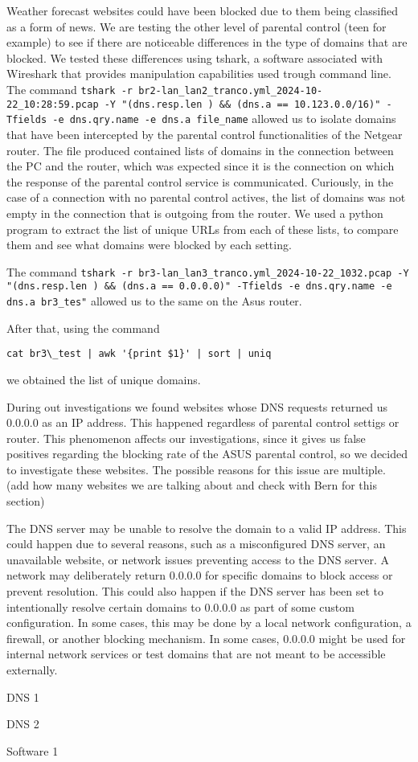 Weather forecast websites could have been blocked due to them being classified as a form of news.
We are testing the other level of parental control (teen for example) to see if there are noticeable differences in the type of domains that are blocked.
We tested these differences using tshark, a software associated with Wireshark that provides manipulation capabilities used trough command line.
The command \texttt{tshark -r br2-lan\_lan2\_tranco.yml\_2024-10-22\_10:28:59.pcap -Y "(dns.resp.len ) \&\& (dns.a == 10.123.0.0/16)" -Tfields -e dns.qry.name -e dns.a \> file\_name} allowed us to isolate domains that have been intercepted by the parental control functionalities of the Netgear router.
The file produced contained lists of domains in the connection between the PC and the router, which was expected since it is the connection on which the response of the parental control service is communicated.
Curiously, in the case of a connection with no parental control actives, the list of domains was not empty in the connection that is outgoing from the router.
We used a python program to extract the list of unique URLs from each of these lists, to compare them and see what domains were blocked by each setting.

The command \texttt{tshark -r br3-lan\_lan3\_tranco.yml\_2024-10-22\_10\:32.pcap -Y "(dns.resp.len ) \&\& (dns.a == 0.0.0.0)" -Tfields -e dns.qry.name -e dns.a \> br3\_tes"} allowed us to the same on the Asus router.
 
After that, using the command \begin{verbatim}cat br3\_test | awk '{print $1}' | sort | uniq\end{verbatim} we obtained the list of unique domains.

During out investigations we found websites whose DNS requests returned us 0.0.0.0 as an IP address.
This happened regardless of parental control settigs or router.
This phenomenon affects our investigations, since it gives us false positives regarding the blocking rate of the ASUS parental control, so we decided to investigate these websites.
The possible reasons for this issue are multiple. (add how many websites we are talking about and check with Bern for this section)

The DNS server may be unable to resolve the domain to a valid IP address. 
This could happen due to several reasons, such as a misconfigured DNS server, an unavailable website, or network issues preventing access to the DNS server.
A network may deliberately return 0.0.0.0 for specific domains to block access or prevent resolution. 
This could also happen if the DNS server has been set to intentionally resolve certain domains to 0.0.0.0 as part of some custom configuration.
In some cases, this may be done by a local network configuration, a firewall, or another blocking mechanism. 
In some cases, 0.0.0.0 might be used for internal network services or test domains that are not meant to be accessible externally. 

DNS 1

DNS 2

Software 1


